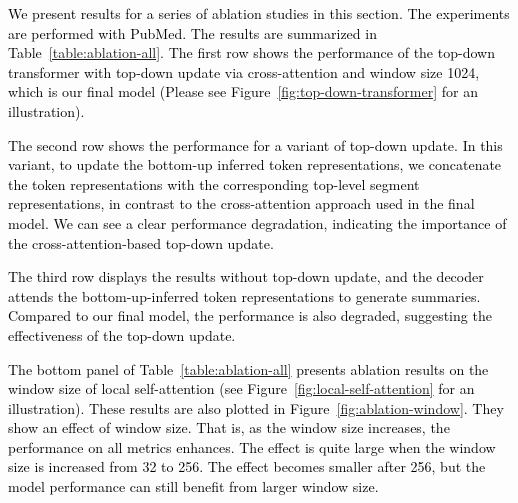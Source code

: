 \textcolor{black}{
We present results for a series of ablation studies in this section. The experiments are performed with PubMed. The results are summarized in Table~\ref{table:ablation-all}. The first row shows the performance of the top-down transformer with top-down update via cross-attention and window size 1024, which is our final model (Please see Figure~\ref{fig:top-down-transformer} for an illustration). 
}

\textcolor{black}{
The second row shows the performance for a variant of top-down update. In this variant, to update the bottom-up inferred token representations, we concatenate the token representations with the corresponding top-level segment representations, in contrast to the cross-attention approach used in the final model. We can see a clear performance degradation, indicating the importance of the cross-attention-based top-down update. 
}

\textcolor{black}{
The third row displays the results without top-down update, and the decoder attends the bottom-up-inferred token representations to generate summaries. Compared to our final model, the performance is also degraded, suggesting the effectiveness of the top-down update. 
}

\textcolor{black}{
The bottom panel of Table~\ref{table:ablation-all} presents ablation results on the window size of local self-attention (see Figure~\ref{fig:local-self-attention} for an illustration). These results are also plotted in Figure~\ref{fig:ablation-window}. They show an effect of window size. That is, as the window size increases, the performance on all metrics enhances. The effect is quite large when the window size is increased from 32 to 256. The effect becomes smaller after 256, but the model performance can still benefit from larger window size. 
}

